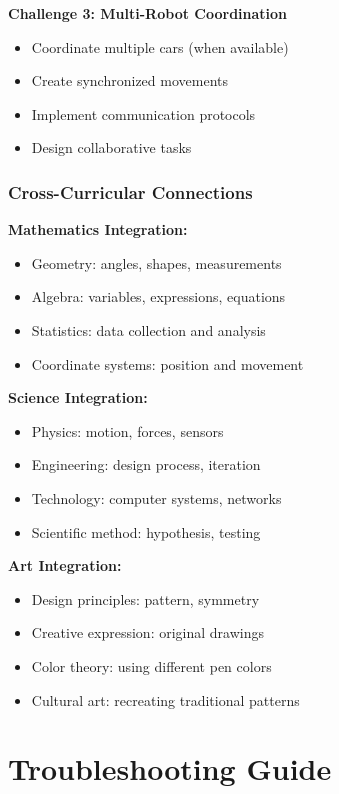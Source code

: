 \textbf{Challenge 3: Multi-Robot Coordination}
\begin{itemize}
    \item Coordinate multiple cars (when available)
    \item Create synchronized movements
    \item Implement communication protocols
    \item Design collaborative tasks
\end{itemize}

\subsubsection{Cross-Curricular Connections}

\textbf{Mathematics Integration:}
\begin{itemize}
    \item Geometry: angles, shapes, measurements
    \item Algebra: variables, expressions, equations
    \item Statistics: data collection and analysis
    \item Coordinate systems: position and movement
\end{itemize}

\textbf{Science Integration:}
\begin{itemize}
    \item Physics: motion, forces, sensors
    \item Engineering: design process, iteration
    \item Technology: computer systems, networks
    \item Scientific method: hypothesis, testing
\end{itemize}

\textbf{Art Integration:}
\begin{itemize}
    \item Design principles: pattern, symmetry
    \item Creative expression: original drawings
    \item Color theory: using different pen colors
    \item Cultural art: recreating traditional patterns
\end{itemize}

\section{Troubleshooting Guide}

